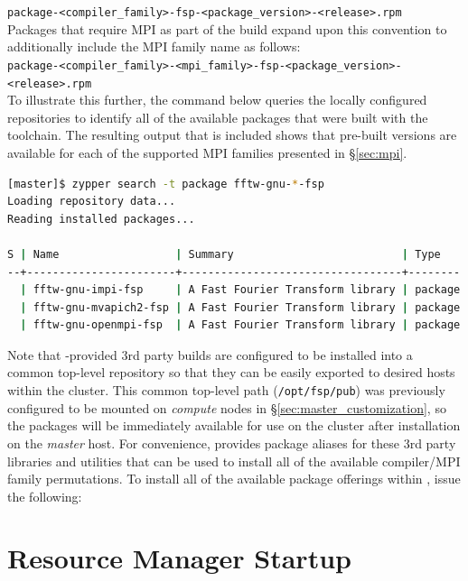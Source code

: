 \documentclass[letterpaper]{article}
\begin{document}
\noindent
\texttt{package-<compiler\_family>-fsp-<package\_version>-<release>.rpm} \\

\noindent Packages that require MPI as part of the build expand upon this convention to
additionally include the MPI family name as follows: \\

\noindent
\texttt{package-<compiler\_family>-<mpi\_family>-fsp-<package\_version>-<release>.rpm} \\

To illustrate this further, the command below queries the locally configured
repositories to identify all of the available \FFTW{} packages that were built
with the \GNU{} toolchain. The resulting output that is included shows that
pre-built versions are available for each of the supported MPI families
presented in \S\ref{sec:mpi}.

\begin{lstlisting}[language=bash]
[master]$ zypper search -t package fftw-gnu-*-fsp
Loading repository data...
Reading installed packages...

S | Name                  | Summary                          | Type   
--+-----------------------+----------------------------------+--------
  | fftw-gnu-impi-fsp     | A Fast Fourier Transform library | package
  | fftw-gnu-mvapich2-fsp | A Fast Fourier Transform library | package
  | fftw-gnu-openmpi-fsp  | A Fast Fourier Transform library | package
\end{lstlisting}

Note that \FSP{}-provided 3rd party builds are configured to be installed
into a common top-level repository so that they can be easily exported to
desired hosts within the cluster. This common top-level path
(\texttt{/opt/fsp/pub}) was previously configured to be mounted on {\em
  compute} nodes in \S\ref{sec:master_customization}, so the packages will be
immediately available for use on the cluster after installation on the {\em
  master} host.  For convenience, \FSP{} provides package aliases for these 3rd
party libraries and utilities that can be used to install all of the available
compiler/MPI family permutations. To install all of the available package
offerings within \FSP{}, issue the following:



\section{Resource Manager Startup} \label{sec:rms_startup}

\end{document}

